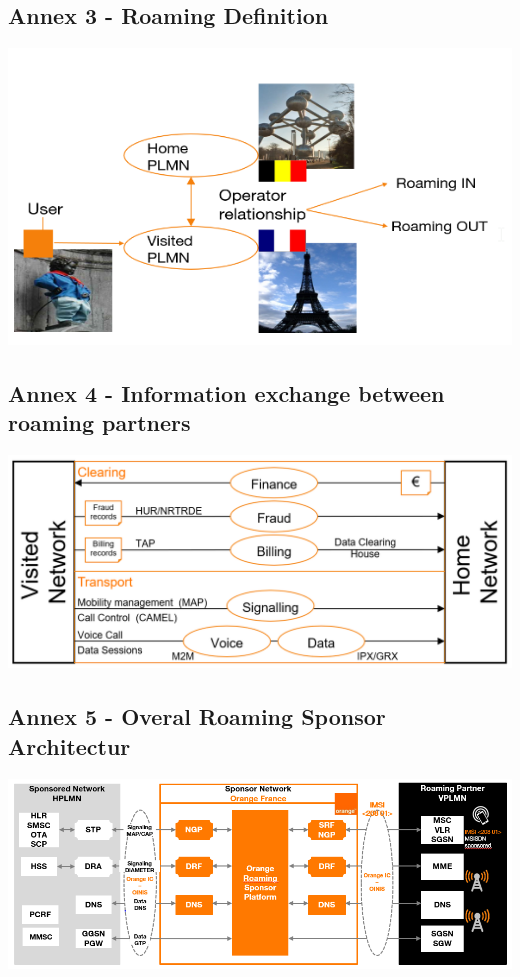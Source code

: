 \subsection*{Annex 3 - Roaming Definition}
\begin{center}
\includegraphics[scale=0.71]{annexs/romdef.PNG}
\end{center}

\subsection*{Annex 4 - Information exchange between roaming partners}
\begin{center}
\includegraphics[scale=0.71]{annexs/Roaming relation .PNG}
\end{center}

\subsection*{Annex 5 - Overal Roaming Sponsor Architectur}
\begin{center}
\includegraphics[scale=0.8]{annexs/Raoming sponsor architecture.PNG}
\end{center}

